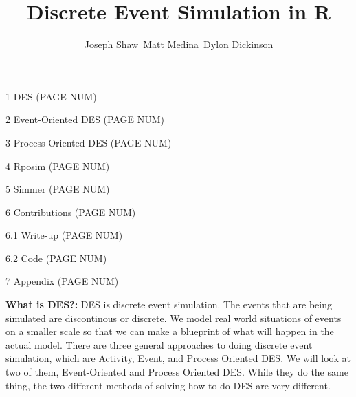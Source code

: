 \documentclass[titlepage]{article}
\author{\Large \newline Joseph Shaw\, Matt Medina\, Dylon Dickinson}
\title{\Huge Discrete Event Simulation in R}
\begin{document}
	\maketitle
	
\clearpage

\vspace{-1in}


\tableofcontents

\Large

\vfill

1 \hspace{0.1in} DES \hfill (PAGE NUM)

\vfill

2 \hspace{0.1in} Event-Oriented DES \hfill (PAGE NUM)

\vfill

3 \hspace{0.1in} Process-Oriented DES \hfill (PAGE NUM)

\vfill

4 \hspace{0.1in} Rposim \hfill (PAGE NUM)

\vfill

5 \hspace{0.1in} Simmer \hfill (PAGE NUM)

\vfill

6 \hspace{0.1in} Contributions \hfill (PAGE NUM)

\vfill

\hspace{0.25in} 6.1 \hspace{0.1in} Write-up \hfill (PAGE NUM)

\vfill

\hspace{0.25in} 6.2 \hspace{0.1in} Code \hfill (PAGE NUM)

\vfill

7 \hspace{0.1in} Appendix \hfill (PAGE NUM)

\clearpage



\Large \textbf{What is DES?:} \normalsize
DES is discrete event simulation. The events that are being simulated are discontinous or discrete. We model real world situations of events on a smaller scale so that we can make a blueprint of what will happen in the actual model. There are three general approaches to doing discrete event simulation, which are Activity, Event, and Process Oriented DES. We will look at two of them, Event-Oriented and Process Oriented DES. While they do the same thing, the two different methods of solving how to do DES are very different.
\end{document}
